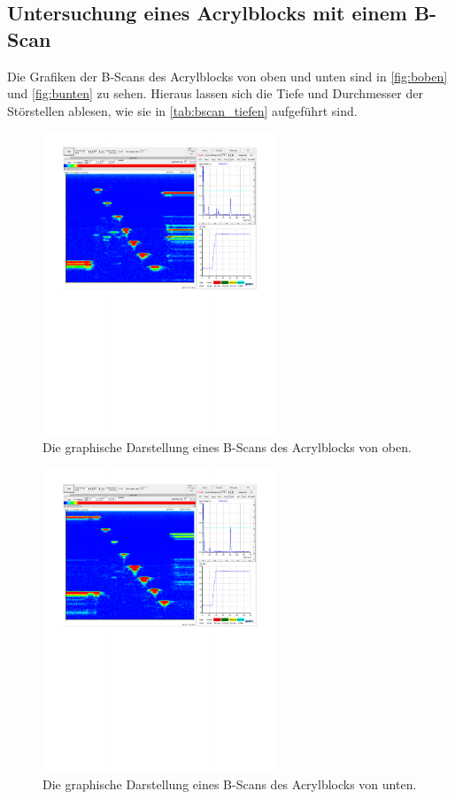 \subsection{Untersuchung eines Acrylblocks mit einem B-Scan}

Die Grafiken der B-Scans des Acrylblocks von oben und unten 
sind in \autoref{fig:boben} und \autoref{fig:bunten} zu sehen.
Hieraus lassen sich die Tiefe und Durchmesser der Störstellen ablesen, wie sie 
in \autoref{tab:bscan_tiefen} aufgeführt sind.


\begin{figure}[H]
  \centering
  \includegraphics[width = 7cm]{content/bscan_oben.pdf}
  \caption{Die graphische Darstellung eines B-Scans des Acrylblocks von oben.}
  \label{fig:boben}
\end{figure}

\begin{figure}[H]
  \centering
  \includegraphics[width = 7cm]{content/bscan_unten.pdf}
  \caption{Die graphische Darstellung eines B-Scans des Acrylblocks von unten.}
  \label{fig:bunten}
\end{figure}


